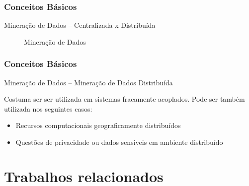 \documentclass[hyperref={pdfpagelabels=false}]{beamer}
\begin{document}
\begin{frame}
	\frametitle{Conceitos Básicos}
    
    \Large{Mineração de Dados -- Centralizada x Distribuída}
    \begin{figure}
     \hfill
     \caption{Mineração de Dados}
     \end{figure}
     
\end{frame}

\begin{frame}

	\frametitle{Conceitos Básicos}
    
    \Large{Mineração de Dados -- Mineração de Dados Distribuída}\linebreak
    \normalsize
   
    Costuma ser ser utilizada em sistemas fracamente acoplados. \cite{goldschmidt2015data}
	\linebreak \linebreak Pode ser também utilizada nos seguintes casos: \cite{016-000} \begin{itemize}
    	\item Recursos computacionais geograficamente distribuídos
        \item Questões de privacidade ou dados sensiveis em ambiente distribuído
    \end{itemize}
\end{frame}

\section {Trabalhos relacionados}
\end{document}
